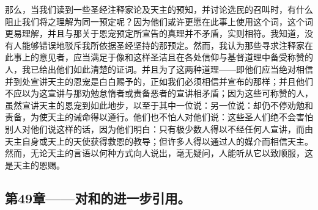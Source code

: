 那么，当我们读到一些圣经注释家论及天主的预知，并讨论选民的召叫时，有什么阻止我们将之理解为同一预定呢？因为他们或许更愿在此事上使用这个词，这个词更易理解，并且与那关于恩宠预定所宣告的真理并不矛盾，实则相符。我知道，没有人能够错误地驳斥我所依据圣经坚持的那预定。然而，我认为那些寻求注释家在此事上的意见者，应当满足于像和这样圣洁且在各处信仰与基督道理中备受称赞的人，我已给出他们如此清楚的证词。并且为了这两种道理——即他们应当绝对相信并到处宣讲天主的恩宠是白白赐予的，正如我们必须相信并宣布的那样；并且他们不应以为这宣讲与那劝勉怠惰者或责备恶者的宣讲相矛盾；因为这些可称赞的人，虽然宣讲天主的恩宠到如此地步，以至于其中一位说：另一位说：却仍不停劝勉和责备，为使天主的诫命得以遵行。他们也不怕人对他们说：这些圣人们绝不会害怕别人对他们说这样的话，因为他们明白：只有极少数人得以不经任何人宣讲，而由天主自身或天上的天使获得救恩的教导；但许多人得以通过人的媒介而相信天主。然而，无论天主的言语以何种方式向人说出，毫无疑问，人能听从它以致顺服，这是天主的恩赐。\par


\subsection{第49章——对和的进一步引用。}

